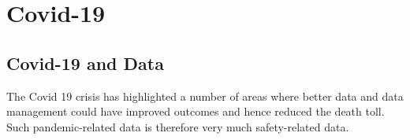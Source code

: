 %
%
\chapter{Covid-19} \label{bkm:Covid19}



\section{Covid-19 and Data}
The Covid 19 crisis has highlighted a number of areas where better data and data management could have improved outcomes and hence reduced the death toll. Such pandemic-related data is therefore very much safety-related data. 

